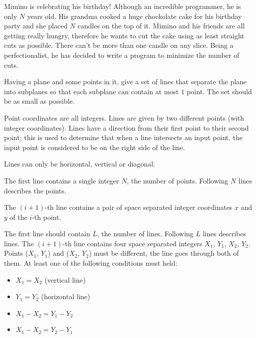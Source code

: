 





Mimino is celebrating his birthday! Although an incredible programmer, he is only $N$ years old. His grandma cooked a huge chockolate cake for his birthday party and she placed $N$ candles on the top of it. Mimino and his friends are all getting really hungry, therefore he wants to cut the cake using as least straight cuts as possible. There can't be more than one candle on any slice. Being a perfectionalist, he has decided to write a program to minimize the number of cuts.


Having a plane and some points in it, give a set of lines that separate the plane into subplanes so that each subplane can contain at most $1$ point. The set should be as small as possible.

Point coordinates are all integers. Lines are given by two different points (with integer coordinates). Lines have a direction from their first point to their second point; this is used to determine that when a line intersects an input point, the input point is considered to be on the right side of the line.

Lines can only be horizontal, vertical or diagonal.


The first line contains a single integer $N$, the number of points.
Following $N$ lines describes the points.

The $(i+1)$-th line contains a pair of space separated integer coordinates $x$ and $y$ of the $i$-th point.


The first line should contain $L$, the number of lines.
Following $L$ lines describes lines.
The $(i+1)$-th line contains four space separated integers $X_1$, $Y_1$, $X_2$, $Y_2$. Points ($X_1$, $Y_1$) and ($X_2$, $Y_2$) must be different, the line goes through both of them. At least one of the following conditions must held:

\begin{itemize}
  \item $X_1 = X_2$ (vertical line)
  \item $Y_1 = Y_2$ (horizontal line)
  \item $X_1 - X_2 = Y_1 - Y_2$
  \item $X_1 - X_2 = Y_2 - Y_1$
\end{itemize}

